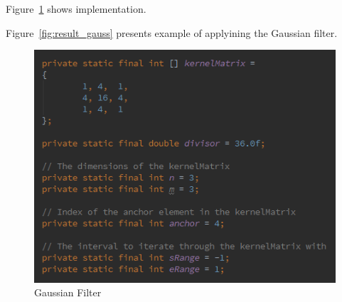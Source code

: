 \documentclass{article}
\begin{document}
Figure~\ref{fig:alg_gauss} shows implementation.

Figure~\ref{fig:result_gauss} presents example of applyining the Gaussian filter.

%
%
\begin{figure}[H]
\centering

  \includegraphics[width=0.9\linewidth]{res/algorithms/gaussian.png}
  
\caption{Gaussian Filter}
\label{fig:alg_gauss}
\end{figure}
\end{document}
